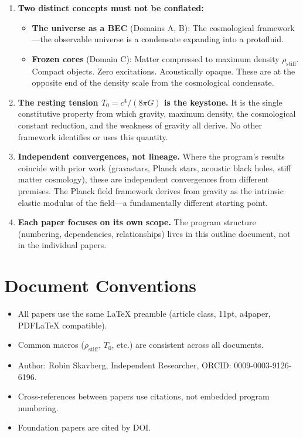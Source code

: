 \documentclass[11pt,a4paper]{article}
\newcommand{\rhostiff}{\ensuremath{\rho_{\mathrm{stiff}}}}
\newcommand{\Tzero}{\ensuremath{T_0}}
\begin{document}
\begin{enumerate}[leftmargin=*, itemsep=0.5em]

\item \textbf{Two distinct concepts must not be conflated:}
\begin{itemize}
\item \textbf{The universe as a BEC} (Domains A, B): The cosmological framework---the observable universe is a condensate expanding into a protofluid.
\item \textbf{Frozen cores} (Domain C): Matter compressed to maximum density $\rhostiff$. Compact objects. Zero excitations. Acoustically opaque. These are at the opposite end of the density scale from the cosmological condensate.
\end{itemize}

\item \textbf{The resting tension $\Tzero = c^4/(8\pi G)$ is the keystone.} It is the single constitutive property from which gravity, maximum density, the cosmological constant reduction, and the weakness of gravity all derive. No other framework identifies or uses this quantity.

\item \textbf{Independent convergences, not lineage.} Where the program's results coincide with prior work (gravastars, Planck stars, acoustic black holes, stiff matter cosmology), these are independent convergences from different premises. The Planck field framework derives from gravity as the intrinsic elastic modulus of the field---a fundamentally different starting point.

\item \textbf{Each paper focuses on its own scope.} The program structure (numbering, dependencies, relationships) lives in this outline document, not in the individual papers.

\end{enumerate}

\section{Document Conventions}
\label{sec:conventions}

\begin{itemize}[leftmargin=*, itemsep=0.3em]
\item All papers use the same LaTeX preamble (article class, 11pt, a4paper, PDFLaTeX compatible).
\item Common macros ($\rhostiff$, $\Tzero$, etc.) are consistent across all documents.
\item Author: Robin Skavberg, Independent Researcher, ORCID: 0009-0003-9126-6196.
\item Cross-references between papers use citations, not embedded program numbering.
\item Foundation papers are cited by DOI.
\end{itemize}
\end{document}
